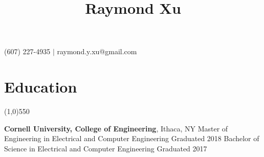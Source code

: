 \documentclass[11pt]{article} %
\title{\vspace{-6ex} \Huge Raymond Xu \vspace{-4ex}}
\author{}
\date{} %
\begin{document}
	\maketitle
	\vspace{-2ex}
	\begin{center}
		(607) 227-4935 $|$ raymond.y.xu@gmail.com \\
		 \vspace{-3ex}
	\end{center}
	\section*{Education}
	\vspace{-7ex}
	\begin{center}
    \line(1,0){550}
    \end{center}
    \vspace{-1ex}
    {\large\textbf{Cornell University, College of Engineering}}, Ithaca, NY \newline
	Master of Engineering in Electrical and Computer Engineering \hfill Graduated 2018\newline
	Bachelor of Science in Electrical and Computer Engineering%
	\hfill Graduated 2017\newline
	\vspace{-6ex}
\end{document}
